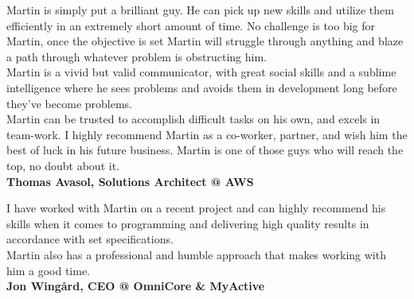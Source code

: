 \documentclass[9pt]{template} %
\begin{document}


\begin{minipage}[t]{\textwidth} %
  \vspace{-\baselineskip}

  Martin is simply put a brilliant guy. He can pick up new skills and utilize them efficiently in an extremely short amount of time. No challenge is too big for Martin, once the objective is set Martin will struggle through anything and blaze a path through whatever problem is obstructing him.\\
  Martin is a vivid but valid communicator, with great social skills and a sublime intelligence where he sees problems and avoids them in development long before they’ve become problems.\\
  Martin can be trusted to accomplish difficult tasks on his own, and excels in team-work. I highly recommend Martin as a co-worker, partner, and wish him the best of luck in his future business. Martin is one of those guys who will reach the top, no doubt about it.\\
  \textbf{Thomas Avasol, Solutions Architect @ AWS}
\end{minipage}

\vspace{20pt}

\begin{minipage}[t]{\textwidth} %
  \vspace{-\baselineskip}

  I have worked with Martin on a recent project and can highly recommend his skills when it comes to programming and delivering high quality results in accordance with set specifications.\\
  Martin also has a professional and humble approach that makes working with him a good time.\\
  \textbf{Jon Wingård, CEO @ OmniCore \& MyActive}
\end{minipage}


\end{document}
